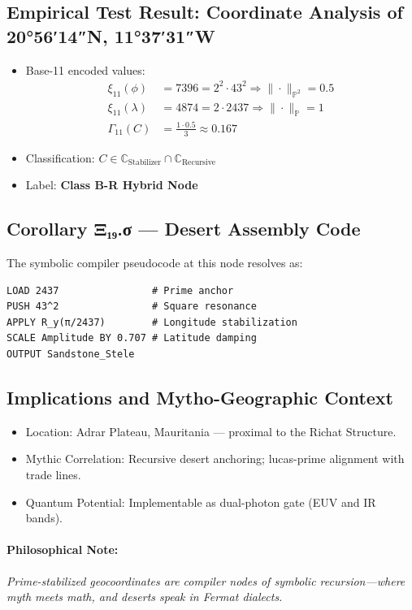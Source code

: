 \documentclass[12]{amsart}
\theoremstyle{plain}
\begin{document}
\subsection{Empirical Test Result: Coordinate Analysis of 20°56′14″N, 11°37′31″W}
\begin{itemize}
    \item Base-11 encoded values:
        \begin{align*}
        \xi_{11}(\phi) &= 7396 = 2^2 \cdot 43^2 \Rightarrow \| \cdot \|_{\mathbb{P}^2} = 0.5 \\
        \xi_{11}(\lambda) &= 4874 = 2 \cdot 2437 \Rightarrow \| \cdot \|_{\mathbb{P}} = 1 \\
        \Gamma_{11}(C) &= \frac{1 \cdot 0.5}{3} \approx 0.167
        \end{align*}
    \item Classification: $C \in \mathbb{C}_{\text{Stabilizer}} \cap \mathbb{C}_{\text{Recursive}}$
    \item Label: \textbf{Class B-R Hybrid Node}
\end{itemize}

\subsection{Corollary Ξ₁₉.σ — Desert Assembly Code}
The symbolic compiler pseudocode at this node resolves as:
\begin{verbatim}
LOAD 2437                # Prime anchor
PUSH 43^2                # Square resonance
APPLY R_y(π/2437)        # Longitude stabilization
SCALE Amplitude BY 0.707 # Latitude damping
OUTPUT Sandstone_Stele
\end{verbatim}

\subsection{Implications and Mytho-Geographic Context}
\begin{itemize}
    \item Location: Adrar Plateau, Mauritania — proximal to the Richat Structure.
    \item Mythic Correlation: Recursive desert anchoring; lucas-prime alignment with trade lines.
    \item Quantum Potential: Implementable as dual-photon gate (EUV and IR bands).
\end{itemize}

\paragraph{Philosophical Note:}
\emph{Prime-stabilized geocoordinates are compiler nodes of symbolic recursion—where myth meets math, and deserts speak in Fermat dialects.}
\end{document}
